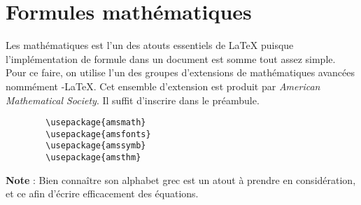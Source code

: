 	\section*{Formules mathématiques}
	Les mathématiques est l'un des atouts essentiels de \LaTeX{} puisque l'implémentation de formule dans un document est somme tout assez simple. Pour ce faire, on utilise l'un des groupes d'extensions de mathématiques avancées nommément \AmS-\LaTeX. Cet ensemble d'extension est produit par \emph{American Mathematical Society}. Il suffit d'inscrire dans le préambule.
%
	\begin{verbatim}
		\usepackage{amsmath}
		\usepackage{amsfonts}
		\usepackage{amssymb}
		\usepackage{amsthm}
	\end{verbatim}
%
	\textbf{Note} : Bien connaître son alphabet grec est un atout à prendre en considération, et ce afin d'écrire efficacement des équations.%
%	
